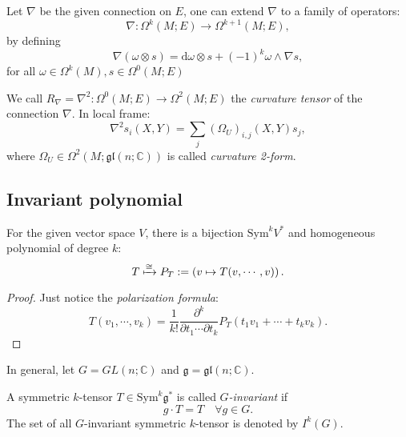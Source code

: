 \documentclass[11pt]{homework}
\begin{document}
\begin{definition}
    Let $\nabla$ be the given connection on $E$, one can extend $\nabla$ to a family of operators:
    \begin{equation*}
        \nabla : \Omega^{k}(M;E)\to \Omega^{k+1}(M;E),
    \end{equation*}
    by defining
    \begin{equation*}
        \nabla (\omega \otimes s) = \mathrm{d} \omega \otimes s + (-1)^k \omega \wedge \nabla s,
    \end{equation*}
    for all $\omega \in \Omega^{k}(M), s\in \Omega^{0}(M;E)$
\end{definition}

\begin{definition}
    We call $R_\nabla = \nabla^2: \Omega^0(M;E)\to \Omega^2(M;E)$ the \textit{curvature tensor} of the connection $\nabla$. In local frame:
    \begin{equation*}
        \nabla^2 s_i (X,Y) = \sum_j \left(\Omega_U\right)_{i,j}(X, Y) s_j,
    \end{equation*}
    where $\Omega_U \in \Omega^2(M;\mathfrak{gl}(n;\mathbb{C}))$ is called \textit{curvature 2-form}.
\end{definition}

\subsection{Invariant polynomial}

\begin{proposition}
    For the given vector space $V$, there is a bijection $\mathrm{Sym}^k V^*$ and homogeneous polynomial of degree $k$:
    \begin{equation*}
        T \xmapsto{\cong} P_T := \left(v \mapsto T(v,\cdots,v)\right).
    \end{equation*}
\end{proposition}
\begin{proof}
    Just notice the \textit{polarization formula}:
    \begin{equation*}
        T(v_1, \cdots, v_k) = \frac{1}{k!}\frac{\partial^k}{\partial t_1 \cdots \partial t_k} P_T(t_1 v_1 + \cdots + t_k v_k).
    \end{equation*}
\end{proof}

In general, let $G = GL(n;\mathbb{C})$ and $\mathfrak{g} = \mathfrak{gl} (n;\mathbb{C})$.

\begin{definition}
    A symmetric $k$-tensor $T \in \mathrm{Sym}^k \mathfrak g^*$ is called \textit{$G$-invariant} if 
    \begin{equation*}
        g \cdot T = T \quad \forall g \in G.
    \end{equation*}
    The set of all $G$-invariant symmetric $k$-tensor is denoted by $I^k(G)$.
\end{definition}
\end{document}
